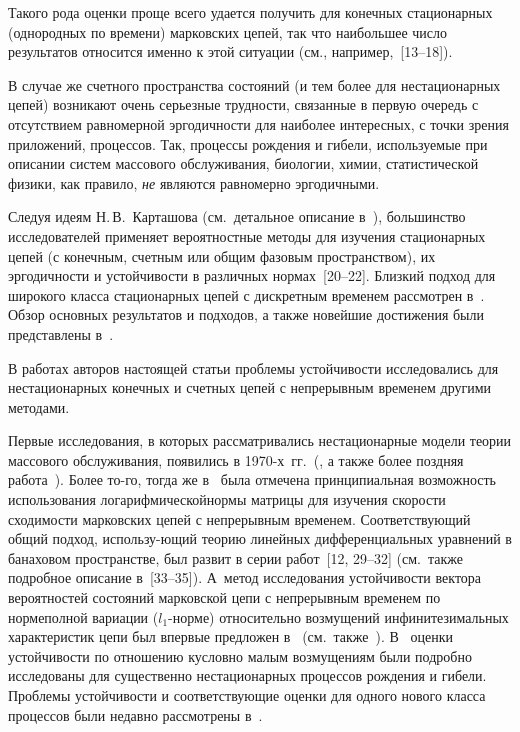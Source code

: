 \begin{multicols}{2}
Такого рода оценки проще всего удается получить для конечных
стационарных (однородных по времени) марковских цепей, так что
наибольшее число результатов относится именно к этой ситуации (см.,
например,~[13--18]).

В случае же счетного пространства состояний (и тем более для нестационарных цепей)
возникают очень серьезные трудности, связанные в первую очередь с отсутствием
равномерной эргодичности для наиболее интересных, с точки зрения приложений, процессов.
Так, процессы рождения и гибели, используемые при описании систем массового обслуживания,
биологии, химии, статистической физики, как правило, {\it не} являются равномерно эргодичными.

Следуя идеям Н.\,В.~Карташова (см.\ детальное описание в~\cite{kar96}),
большинство исследователей применяет вероятностные
методы для изучения стационарных цепей (с конечным, счетным или
общим фазовым пространством), их эргодичности и устойчивости в
различных нормах~[20--22]. Близкий подход для широкого класса
стационарных цепей с дискретным временем рассмотрен в~\cite{mt}.
Обзор основных результатов и подходов, а также новейшие достижения
были представлены в~\cite{yl}.

В работах авторов настоящей статьи проблемы устойчивости исследовались
для нестационарных конечных и счетных
цепей с непрерывным временем другими методами.

Первые исследования, в которых рассматривались нестационарные модели
теории массового обслуживания, появились в 1970-х~гг.~(\cite{g1, g},
а также более поздняя работа~\cite{mw}). Более то-\linebreak го,
тогда же в~\cite{gm} была отмечена принципиальная возможность
использования логарифмической\linebreak нормы матрицы для изучения скорости
схо\-ди\-мости марковских цепей с непрерывным временем. Соответствующий
общий подход, использу-\linebreak ющий тео\-рию линейных дифференциальных\linebreak
уравнений в банаховом пространстве, был развит в серии работ~[12,
29--32] (см.\ также подробное описание в~[33--35]). А~метод
исследования устой\-чи\-вости вектора вероятностей состояний мар\-ковской
цепи с непрерывным временем по норме\linebreak полной вариации ($l_1$-нор\-ме)
относительно возмущений инфинитезимальных характеристик цепи был
впервые предложен в~\cite{z85} (см.\ так\-же~\cite{z88,z94}). %
В~\cite{z98} оценки устойчивости по отношению к\linebreak условно малым
возмущениям были подробно исследованы для существенно нестационарных\linebreak
процессов рождения и гибели. Проблемы устойчивости и соответствующие
оценки для одного нового класса процессов были недавно рас\-смот\-ре\-ны в~\cite{z12, z13c}.
{ %

}
\end{multicols}
